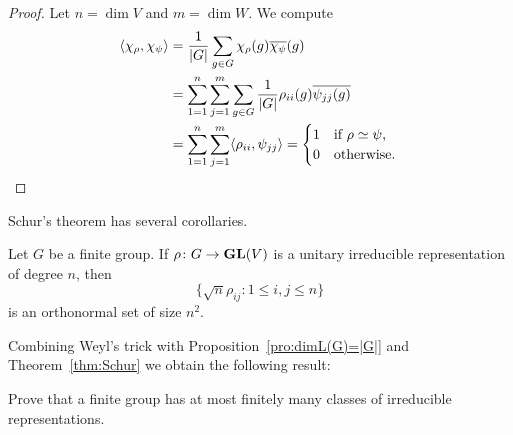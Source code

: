 \begin{proof}
    Let $n=\dim V$ and $m=\dim W$. We compute
    \begin{align*}
        \langle\chi_\rho,\chi_\psi\rangle
        &=\frac{1}{|G|}\sum_{g\in G}\chi_\rho(g)\overline{\chi_\psi}(g)\\
        &=\sum_{1=1}^n\sum_{j=1}^m\sum_{g\in G}\frac{1}{|G|}\rho_{ii}(g)\overline{\psi_{jj}(g)}\\
        &=\sum_{1=1}^n\sum_{j=1}^m\langle \rho_{ii},\psi_{jj}\rangle
        =\begin{cases}
            1 & \text{if $\rho\simeq\psi$,}\\
            0 & \text{otherwise.}
        \end{cases}\qedhere
    \end{align*}
\end{proof}

Schur's theorem has several 
corollaries.

\begin{exercise}
Let $G$ be a finite group. 
If $\rho\colon G\to\mathbf{GL}(V)$ is a unitary irreducible representation
of degree $n$, then
\[
\{\sqrt{n}\rho_{ij}:1\leq i,j\leq n\}
\]
is an orthonormal set of size $n^2$.
\end{exercise}


Combining Weyl's trick with Proposition~\ref{pro:dimL(G)=|G|}
and Theorem~\ref{thm:Schur} 
we obtain the following result: 


\begin{exercise}
     Prove that a finite group has at most 
     finitely many classes of irreducible representations. 
\end{exercise}


